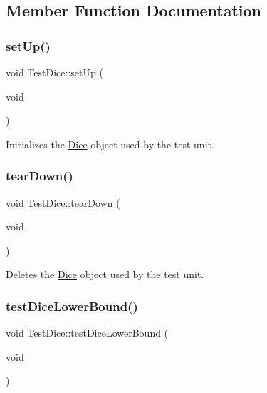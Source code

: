 \subsection{Member Function Documentation}
\hypertarget{class_test_dice_ab667ce059357171f1d8518c052e50f64}{}\label{class_test_dice_ab667ce059357171f1d8518c052e50f64} 
\subsubsection{\texorpdfstring{set\+Up()}{setUp()}}
{\footnotesize\ttfamily void Test\+Dice\+::set\+Up (\begin{DoxyParamCaption}\item[{void}]{ }\end{DoxyParamCaption})}

Initializes the \hyperlink{class_dice}{Dice} object used by the test unit. \hypertarget{class_test_dice_af92d20c1d04e258061ebba44ac109d43}{}\label{class_test_dice_af92d20c1d04e258061ebba44ac109d43} 
\subsubsection{\texorpdfstring{tear\+Down()}{tearDown()}}
{\footnotesize\ttfamily void Test\+Dice\+::tear\+Down (\begin{DoxyParamCaption}\item[{void}]{ }\end{DoxyParamCaption})}

Deletes the \hyperlink{class_dice}{Dice} object used by the test unit. \hypertarget{class_test_dice_aac292c8e6ca7593d523aedd526f24500}{}\label{class_test_dice_aac292c8e6ca7593d523aedd526f24500} 
\subsubsection{\texorpdfstring{test\+Dice\+Lower\+Bound()}{testDiceLowerBound()}}
{\footnotesize\ttfamily void Test\+Dice\+::test\+Dice\+Lower\+Bound (\begin{DoxyParamCaption}\item[{void}]{ }\end{DoxyParamCaption})\hspace{0.3cm}{\ttfamily [protected]}}

